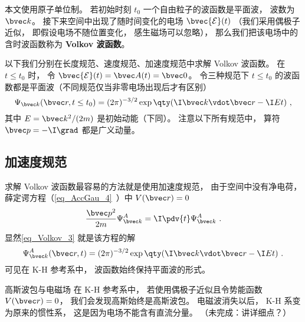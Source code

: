 
\begin{issues}
\issueTODO
\end{issues}


本文使用原子单位制。 若初始时刻 $t_0$ 一个自由粒子的波函数是平面波， 波数为 $\bvec k$。 接下来空间中出现了随时间变化的电场 $\bvec {\mathcal E}(t)$ （我们采用偶极子近似， 即假设电场不随位置变化， 感生磁场可以忽略）， 那么我们把该电场中的含时波函数称为 \textbf{Volkov 波函数}。

以下我们分别在长度规范、速度规范、加速度规范中求解 Volkov 波函数。 在 $t \le t_0$ 时， 令 $\bvec {\mathcal E}(t) = \bvec A(t) = \bvec 0$。 令三种规范下 $t \le t_0$ 的波函数都是平面波（不同规范仅当非零电场出现后才有区别）
\begin{equation}\label{eq_Volkov_3}
\Psi_{\bvec k}(\bvec r, t \le t_0) = (2\pi)^{-3/2} \exp\qty(\I\bvec k \vdot \bvec r - \I E t)~,
\end{equation}
其中 $E = \bvec k^2/(2m)$ 是初始动能（下同）。 注意以下所有规范中， 算符 $\bvec p = -\I \grad$ 都是广义动量。

\subsection{加速度规范}
求解 Volkov 波函数最容易的方法就是使用加速度规范， 由于空间中没有净电荷， 薛定谔方程（\autoref{eq_AccGau_4}~）中 $V(\bvec r) = 0$
\begin{equation}
\frac{\bvec p^2}{2m}\Psi_{\bvec k}^A = \I \pdv{t} \Psi_{\bvec k}^A~.
\end{equation}
显然\autoref{eq_Volkov_3} 就是该方程的解
\begin{equation}\label{eq_Volkov_2}
\Psi_{\bvec k}^A(\bvec r, t) = (2\pi)^{-3/2} \exp\qty(\I\bvec k \vdot \bvec r - \I E t)~.
\end{equation}
可见在 K-H 参考系中， 波函数始终保持平面波的形式。

\begin{example}{高斯波包与电磁场}
在 K-H 参考系中， 若使用偶极子近似且令势能函数 $V(\bvec r) = 0$， 我们会发现高斯始终是高斯波包。 电磁波消失以后， K-H 系变为原来的惯性系， 这是因为电场不能含有直流分量。 （未完成：讲详细点？）
\end{example}

